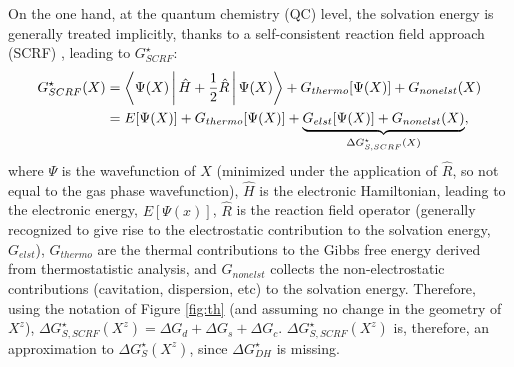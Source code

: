 \documentclass[review,preprint]{elsarticle}
\begin{document}
On the one hand, at the quantum chemistry (QC) level, the solvation energy is generally treated implicitly, thanks to a self-consistent reaction field approach (SCRF) \cite{herbertDielectricContinuumMethods2021}, leading to $G^\star_{SCRF}$: \begin{align}
	G^\star_{SCRF}(X) &= \Braket{\Psi(X)|{\hat{H}+\frac{1}{2}\hat{R}}|\Psi(X)} + G_{thermo}[\Psi(X)] + G_{nonelst}(X) \nonumber\\
	&= E[\Psi(X)] + G_{thermo}[\Psi(X)] + \underbrace{G_{elst}[\Psi(X)] + G_{nonelst}(X)}_{\Delta G^\star_{S,SCRF}(X)}, \label{eq:scrf}
\end{align}
where $\Psi$ is the wavefunction of $X$ (minimized under the application of $\hat R$, so not equal to the gas phase wavefunction), $\hat H$ is the electronic Hamiltonian, leading to the electronic energy, $E[\Psi(x)]$, $\hat R$ is the reaction field operator (generally recognized to give rise to the electrostatic contribution to the solvation energy, $G_{elst}$), $G_{thermo}$ are the thermal contributions to the Gibbs free energy derived from thermostatistic analysis, and $G_{nonelst}$ collects the non-electrostatic contributions (cavitation, dispersion, etc) to the solvation energy. Therefore, using the notation of Figure \ref{fig:th} (and assuming no change in the geometry of $X^z$), $ \Delta G^\star_{S,SCRF}(X^z) = \Delta G_d + \Delta G_s + \Delta G_{c}$. $ \Delta G^\star_{S,SCRF}(X^z)$ is, therefore, an approximation to $\Delta G^\star_S(X^z)$, since $\Delta G^\star_{DH}$ is missing. 
\end{document}
